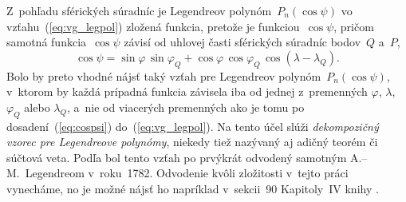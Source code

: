 \documentclass[a4paper,12pt]{book}
\begin{document}
Z~pohľadu sférických súradníc je Legendreov polynóm~$P_n(\cos\psi)$ vo 
vzťahu~(\ref{eq:vg_legpol}) zložená funkcia, pretože je funkciou~$\cos\psi$, 
pričom samotná funkcia~$\cos\psi$ závisí od uhlovej časti sférických súradníc 
bodov~$Q$ a~$P$,
%
\begin{equation}
\label{eq:cospsi}
\cos\psi = \sin\varphi \, \sin\varphi_Q + \cos\varphi \, \cos\varphi_Q \,
\cos(\lambda - \lambda_Q){.}
\end{equation}
%
Bolo by preto vhodné nájsť taký vzťah pre Legendreov polynóm~$P_n(\cos\psi)$,
v~ktorom by každá prípadná funkcia závisela iba od jednej z~premenných
$\varphi$, $ \lambda$, $\varphi_Q$ alebo $\lambda_Q$, a~nie od viacerých
premenných ako je tomu po dosadení~(\ref{eq:cospsi})
do~(\ref{eq:vg_legpol}).  Na tento účel slúži \emph{dekompozičný vzorec pre
Legendreove polynómy}, niekedy tiež nazývaný aj adičný teorém či súčtová veta.
Podľa \textcite{Hobson} bol tento vzťah po prvýkrát odvodený samotným
A.--M.~Legendreom v~roku~1782.  Odvodenie kvôli zložitosti v~tejto práci
vynecháme, no je možné nájsť ho napríklad v~sekcii~90 Kapitoly~IV knihy
\textcite{Hobson}.
\end{document}
